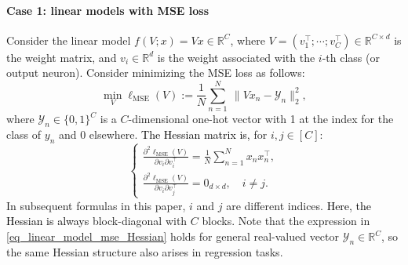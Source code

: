 \documentclass{article}
\newcommand{\1}{^{(1)}}
\newcommand{\2}{^{(2)}}
\newcommand{\zhaoruirevise}[1]{\textcolor{black}{ #1}}
\begin{document}
\paragraph{Case 1: linear models with MSE loss}  
 Consider the linear model $f(V;x) = Vx \in \mathbb{R}^{C}$, where  $V  = (v_1^\top;\cdots;v_C^\top)\in \mathbb{R}^{C\times d}$ is the weight matrix, and $v_i \in\mathbb{R}^d$ is the weight associated with the $i$-th class (or output neuron).  Consider minimizing the MSE loss as follows: 
\begin{equation}
    \label{eq_linear_model_mse}
    \min_V \ell_{\text{MSE}}(V) := \frac{1}{N}\sum_{n= 1}^N\ \|Vx_n- \mathcal{Y}_n\|_2^2,
\end{equation}
where $\mathcal{Y}_n \in \{0,1\}^C$ is a $C$-dimensional one-hot vector with  1 at the index for the class of $y_n$  and 0 elsewhere. \zhaoruirevise{The Hessian matrix is, } for $i,j \in [C]$:
\begin{equation}
\label{eq_linear_model_mse_Hessian}
\left\{\begin{array}{l}
    \frac{\partial^2\ell_{\text{MSE}}(V)}{\partial v_i  \partial v_i^\top} = \frac{1}{N}\sum_{n= 1}^N x_n x_n^\top, \\[2mm]
    \frac{\partial^2\ell_{\text{MSE}}(V)}{\partial v_i  \partial v_j^\top} = 0_{d\times d},\quad i\ne j.
\end{array}\right.
\end{equation}
In subsequent formulas in this paper, $i$ and $j$ are different indices.
\zhaoruirevise{ Here, the Hessian is always} block-diagonal with $C$ blocks. Note that the expression in \eqref{eq_linear_model_mse_Hessian} holds for general real-valued vector $\mathcal{Y}_n \in \mathbb{R}^C$, so the same Hessian structure also arises in regression tasks.
\end{document}
